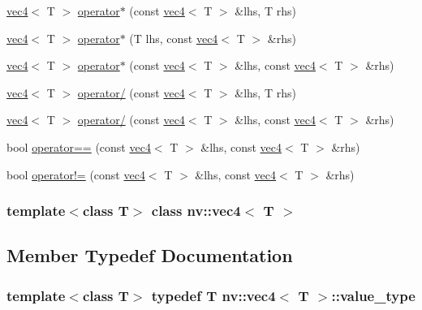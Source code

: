 \begin{CompactItemize}
\hyperlink{classnv_1_1vec4}{vec4}$<$ T $>$ \hyperlink{classnv_1_1vec4_c8719df8fcfe7bd7c41d23018f00357f}{operator$\ast$} (const \hyperlink{classnv_1_1vec4}{vec4}$<$ T $>$ \&lhs, T rhs)
\item 
\hyperlink{classnv_1_1vec4}{vec4}$<$ T $>$ \hyperlink{classnv_1_1vec4_75870d1aa79efe3fb376f3b28052da06}{operator$\ast$} (T lhs, const \hyperlink{classnv_1_1vec4}{vec4}$<$ T $>$ \&rhs)
\item 
\hyperlink{classnv_1_1vec4}{vec4}$<$ T $>$ \hyperlink{classnv_1_1vec4_636e2ea72649260c3f304e6262456491}{operator$\ast$} (const \hyperlink{classnv_1_1vec4}{vec4}$<$ T $>$ \&lhs, const \hyperlink{classnv_1_1vec4}{vec4}$<$ T $>$ \&rhs)
\item 
\hyperlink{classnv_1_1vec4}{vec4}$<$ T $>$ \hyperlink{classnv_1_1vec4_6b55551a180bd0607a442da9bb6ccea8}{operator/} (const \hyperlink{classnv_1_1vec4}{vec4}$<$ T $>$ \&lhs, T rhs)
\item 
\hyperlink{classnv_1_1vec4}{vec4}$<$ T $>$ \hyperlink{classnv_1_1vec4_713208aac0e72cd0679403ee461d7b62}{operator/} (const \hyperlink{classnv_1_1vec4}{vec4}$<$ T $>$ \&lhs, const \hyperlink{classnv_1_1vec4}{vec4}$<$ T $>$ \&rhs)
\item 
bool \hyperlink{classnv_1_1vec4_f17126e65a8b03eaab3cc44f09d298d0}{operator==} (const \hyperlink{classnv_1_1vec4}{vec4}$<$ T $>$ \&lhs, const \hyperlink{classnv_1_1vec4}{vec4}$<$ T $>$ \&rhs)
\item 
bool \hyperlink{classnv_1_1vec4_7ebfb7c5815e8cec967b56c867105d29}{operator!=} (const \hyperlink{classnv_1_1vec4}{vec4}$<$ T $>$ \&lhs, const \hyperlink{classnv_1_1vec4}{vec4}$<$ T $>$ \&rhs)
\end{CompactItemize}
\subsubsection*{template$<$class T$>$ class nv::vec4$<$ T $>$}



\subsection{Member Typedef Documentation}
\hypertarget{classnv_1_1vec4_09fb8b95c9c02056c65620ea2fba281b}{
\subsubsection[{value\_\-type}]{\setlength{\rightskip}{0pt plus 5cm}template$<$class T$>$ typedef T {\bf nv::vec4}$<$ T $>$::{\bf value\_\-type}}}
\label{classnv_1_1vec4_09fb8b95c9c02056c65620ea2fba281b}




